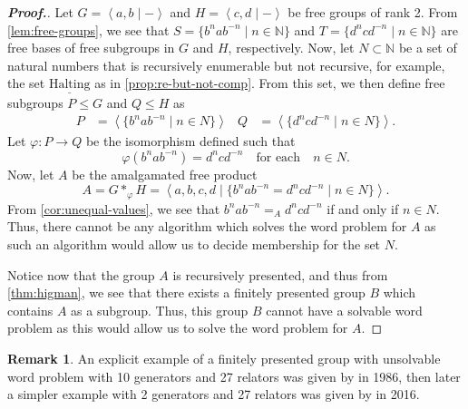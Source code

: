 \documentclass[11pt,a4paper,reqno]{amsart}
\theoremstyle{plain}
\theoremstyle{definition}
\theoremstyle{definition}
\newtheorem{remark}[theorem]{Remark}
\renewcommand\leq\leqslant
\newenvironment{myproof}{\begin{proof}[\normalfont\bfseries Proof.]}{\end{proof}}
\begin{document}
\begin{myproof}
	Let $G = \left\langle a,b \mid - \right\rangle$ and $H = \left\langle c,d \mid - \right\rangle$ be free groups of rank 2.
	From \cref{lem:free-groups}, we see that $S = \{ b^n a b^{-n} \mid n\in \mathbb N \}$ and $T = \{ d^n c d^{-n} \mid n\in \mathbb N \}$ are free bases of free subgroups in $G$ and $H$, respectively.
  Now, let $N\subset \mathbb N$ be a set of natural numbers that is recursively enumerable but not recursive, for example, the set $\underline{\mathrm{Halting}}$ as in \cref{prop:re-but-not-comp}.
	From this set, we then define free subgroups $P\leq G$ and $Q\leq H$ as
	\begin{align*}
		P & = \left\langle \{b^n a b^{-n} \mid n \in N\} \right\rangle &
		Q & = \left\langle \{d^n c d^{-n} \mid n \in N \}\right\rangle.
	\end{align*}
	Let $\varphi\colon P \to Q$ be the isomorphism defined such that
	\[
		\varphi(b^n a b^{-n}) = d^n c d^{-n}
		\quad\text{for each}\quad n \in N.
	\]
	Now, let $A$ be the amalgamated free product
	\[
		A
		=
		G*_\varphi H
		=
		\left\langle
		a,b,c,d
		\mid
		\{
		b^n a b^{-n}
		=
		d^n c d^{-n}
		\mid
		n \in N
		\}
		\right\rangle.
	\]
	From \cref{cor:unequal-values}, we see that $b^n a b^{-n} =_A d^n c d^{-n}$ if and only if $n \in N$.
	Thus, there cannot be any algorithm which solves the word problem for $A$ as such an algorithm would allow us to decide membership for the set $N$.

	Notice now that the group $A$ is recursively presented, and thus from \cref{thm:higman}, we see that there exists a finitely presented group $B$ which contains $A$ as a subgroup.
	Thus, this group $B$ cannot have a solvable word problem as this would allow us to solve the word problem for $A$.
\end{myproof}

\begin{remark}
	An explicit example of a finitely presented group with unsolvable word problem with 10 generators and 27 relators was given by \textcite{collins1986} in 1986, then later a simpler example with 2 generators and 27 relators was given by \textcite{wang2016} in 2016.
\end{remark}

\printbibliography
\end{document}
